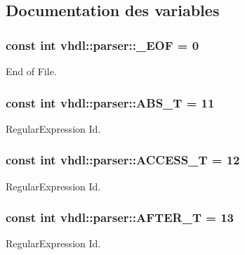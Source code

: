 \subsection{Documentation des variables}
\hypertarget{namespacevhdl_1_1parser_a3e4ca88943b20b46f48a1f70b1df4647}{}
\subsubsection[{\+\_\+\+E\+O\+F}]{\setlength{\rightskip}{0pt plus 5cm}const int vhdl\+::parser\+::\+\_\+\+E\+O\+F = 0}\label{namespacevhdl_1_1parser_a3e4ca88943b20b46f48a1f70b1df4647}
End of File. \hypertarget{namespacevhdl_1_1parser_a41c83695e5f0cea7f929e860dbf7099f}{}
\subsubsection[{A\+B\+S\+\_\+\+T}]{\setlength{\rightskip}{0pt plus 5cm}const int vhdl\+::parser\+::\+A\+B\+S\+\_\+\+T = 11}\label{namespacevhdl_1_1parser_a41c83695e5f0cea7f929e860dbf7099f}
Regular\+Expression Id. \hypertarget{namespacevhdl_1_1parser_acbb62663b8e385122134bed99a2c2515}{}
\subsubsection[{A\+C\+C\+E\+S\+S\+\_\+\+T}]{\setlength{\rightskip}{0pt plus 5cm}const int vhdl\+::parser\+::\+A\+C\+C\+E\+S\+S\+\_\+\+T = 12}\label{namespacevhdl_1_1parser_acbb62663b8e385122134bed99a2c2515}
Regular\+Expression Id. \hypertarget{namespacevhdl_1_1parser_af98910d232fcd226d1ec73fb1a79aa3f}{}
\subsubsection[{A\+F\+T\+E\+R\+\_\+\+T}]{\setlength{\rightskip}{0pt plus 5cm}const int vhdl\+::parser\+::\+A\+F\+T\+E\+R\+\_\+\+T = 13}\label{namespacevhdl_1_1parser_af98910d232fcd226d1ec73fb1a79aa3f}
Regular\+Expression Id. \hypertarget{namespacevhdl_1_1parser_acae81aea8007d66faa9e2207c709538a}{}

